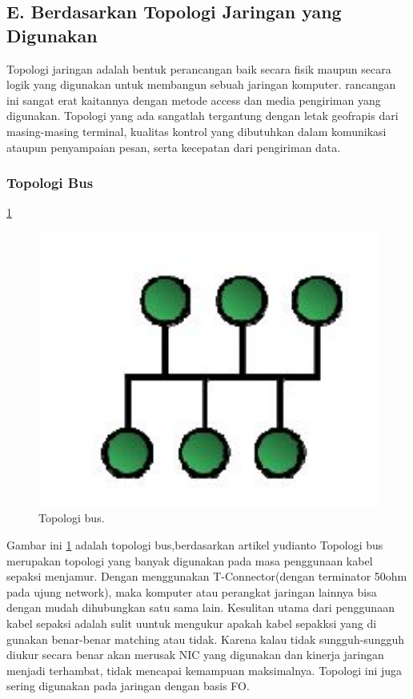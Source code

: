 \subsection{E. Berdasarkan Topologi Jaringan yang Digunakan}
  Topologi jaringan adalah bentuk perancangan baik secara fisik maupun secara logik yang digunakan untuk membangun sebuah jaringan komputer. rancangan ini sangat erat kaitannya dengan metode access dan media pengiriman yang digunakan. Topologi yang ada sangatlah tergantung dengan letak geofrapis dari masing-masing terminal, kualitas kontrol yang dibutuhkan dalam komunikasi ataupun penyampaian pesan, serta kecepatan dari pengiriman data.
  \subsubsection{Topologi Bus}
    \ref{bus}
  	\begin{figure}[ht]
  	\centerline{\includegraphics[width=1\textwidth]{figures/bus.JPG}}
  	\caption{Topologi bus.}
  	\label{bus}
  	\end{figure}
    Gambar ini \ref{bus} adalah topologi bus,berdasarkan artikel yudianto Topologi bus merupakan topologi yang banyak digunakan pada masa penggunaan kabel sepaksi menjamur\cite{yudianto2007jaringan}. Dengan menggunakan T-Connector(dengan terminator 50ohm pada ujung network), maka komputer atau perangkat jaringan lainnya bisa dengan mudah dihubungkan satu sama lain.
  Kesulitan utama dari penggunaan kabel sepaksi adalah sulit uuntuk mengukur apakah kabel sepakksi yang di gunakan benar-benar matching atau tidak. Karena kalau tidak sungguh-sungguh diukur secara benar akan merusak NIC yang digunakan dan kinerja jaringan menjadi terhambat, tidak mencapai kemampuan maksimalnya. Topologi ini juga sering digunakan pada jaringan dengan basis FO.
